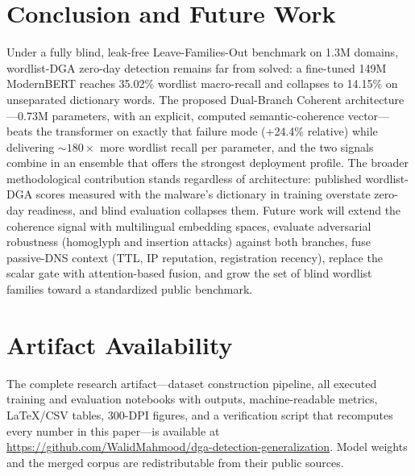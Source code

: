 \documentclass[conference]{IEEEtran}
\begin{document}
\section{Conclusion and Future Work}
Under a fully blind, leak-free Leave-Families-Out benchmark on 1.3M domains, wordlist-DGA zero-day detection remains far from solved: a fine-tuned 149M ModernBERT reaches 35.02\% wordlist macro-recall and collapses to 14.15\% on unseparated dictionary words. The proposed Dual-Branch Coherent architecture---0.73M parameters, with an explicit, computed semantic-coherence vector---beats the transformer on exactly that failure mode (+24.4\% relative) while delivering ${\sim}180\times$ more wordlist recall per parameter, and the two signals combine in an ensemble that offers the strongest deployment profile. The broader methodological contribution stands regardless of architecture: published wordlist-DGA scores measured with the malware's dictionary in training overstate zero-day readiness, and blind evaluation collapses them. Future work will extend the coherence signal with multilingual embedding spaces, evaluate adversarial robustness (homoglyph and insertion attacks) against both branches, fuse passive-DNS context (TTL, IP reputation, registration recency), replace the scalar gate with attention-based fusion, and grow the set of blind wordlist families toward a standardized public benchmark.

\section*{Artifact Availability}
The complete research artifact---dataset construction pipeline, all executed training and evaluation notebooks with outputs, machine-readable metrics, LaTeX/CSV tables, 300-DPI figures, and a verification script that recomputes every number in this paper---is available at \url{https://github.com/WalidMahmood/dga-detection-generalization}. Model weights and the merged corpus are redistributable from their public sources.
\end{document}
